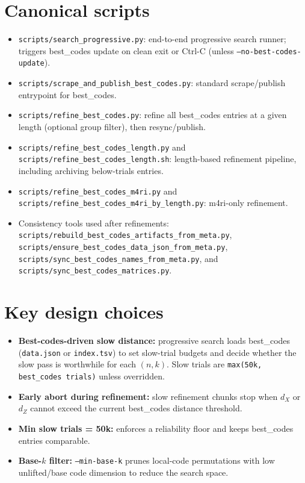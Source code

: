 \documentclass[11pt]{article}
\begin{document}
\section{Canonical scripts}
\begin{itemize}
  \item \texttt{scripts/search\_progressive.py}: end-to-end progressive search runner;
    triggers best\_codes update on clean exit or Ctrl-C (unless
    \texttt{--no-best-codes-update}).
  \item \texttt{scripts/scrape\_and\_publish\_best\_codes.py}: standard scrape/publish
    entrypoint for best\_codes.
  \item \texttt{scripts/refine\_best\_codes.py}: refine all best\_codes entries at a
    given length (optional group filter), then resync/publish.
  \item \texttt{scripts/refine\_best\_codes\_length.py} and
    \texttt{scripts/refine\_best\_codes\_length.sh}: length-based refinement pipeline,
    including archiving below-trials entries.
  \item \texttt{scripts/refine\_best\_codes\_m4ri.py} and
    \texttt{scripts/refine\_best\_codes\_m4ri\_by\_length.py}: m4ri-only refinement.
  \item Consistency tools used after refinements:
    \texttt{scripts/rebuild\_best\_codes\_artifacts\_from\_meta.py},
    \texttt{scripts/ensure\_best\_codes\_data\_json\_from\_meta.py},
    \texttt{scripts/sync\_best\_codes\_names\_from\_meta.py}, and
    \texttt{scripts/sync\_best\_codes\_matrices.py}.
\end{itemize}

\section{Key design choices}
\begin{itemize}
  \item \textbf{Best-codes-driven slow distance:} progressive search loads best\_codes
    (\texttt{data.json} or \texttt{index.tsv}) to set slow-trial budgets and decide
    whether the slow pass is worthwhile for each $(n,k)$. Slow trials are
    \texttt{max(50k, best\_codes trials)} unless overridden.
  \item \textbf{Early abort during refinement:} slow refinement chunks stop when
    $d_X$ or $d_Z$ cannot exceed the current best\_codes distance threshold.
  \item \textbf{Min slow trials = 50k:} enforces a reliability floor and keeps
    best\_codes entries comparable.
  \item \textbf{Base-$k$ filter:} \texttt{--min-base-k} prunes local-code permutations
    with low unlifted/base code dimension to reduce the search space.
\end{itemize}
\end{document}
